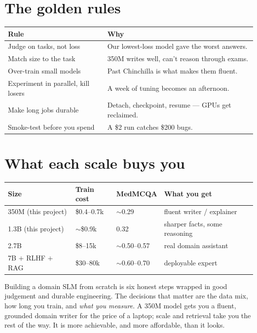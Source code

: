 \section{The golden rules}
\begin{center}\small
\begin{tabular}{@{}p{}p{}@{}}
\toprule
\textbf{Rule} & \textbf{Why}\\
\midrule
Judge on tasks, not loss & Our lowest-loss model gave the worst answers.\\
Match size to the task & 350M writes well, can't reason through exams.\\
Over-train small models & Past Chinchilla is what makes them fluent.\\
Experiment in parallel, kill losers & A week of tuning becomes an afternoon.\\
Make long jobs durable & Detach, checkpoint, resume --- GPUs get reclaimed.\\
Smoke-test before you spend & A \$2 run catches \$200 bugs.\\
\bottomrule
\end{tabular}
\end{center}

\section{What each scale buys you}
\begin{center}\small
\begin{tabular}{@{}llll@{}}
\toprule
\textbf{Size} & \textbf{Train cost} & \textbf{MedMCQA} & \textbf{What you get}\\
\midrule
350M (this project) & \$0.4--0.7k & $\sim$0.29 & fluent writer / explainer\\
1.3B (this project) & $\sim$\$0.9k & 0.32 & sharper facts, some reasoning\\
2.7B & \$8--15k & $\sim$0.50--0.57 & real domain assistant\\
7B $+$ RLHF $+$ RAG & \$30--80k & $\sim$0.60--0.70 & deployable expert\\
\bottomrule
\end{tabular}
\end{center}


\begin{lesson}
Building a domain SLM from scratch is six honest steps wrapped in good judgement and durable engineering. The
decisions that matter are the data mix, how long you train, and \emph{what you measure}. A 350M model gets you
a fluent, grounded domain writer for the price of a laptop; scale and retrieval take you the rest of the way.
It is more achievable, and more affordable, than it looks.
\end{lesson}
